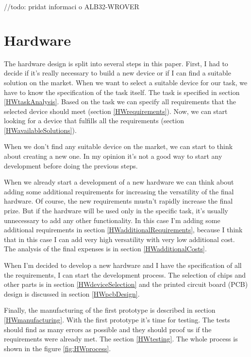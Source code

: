 //todo: pridat informaci o ALB32-WROVER

\chapter{Hardware}
The hardware design is split into several steps in this paper. First, I had to decide if it's really necessary to build a new device or if I can find a suitable solution on the market. When we want to select a suitable device for our task, we have to know the specification of the task itself. The task is specified in section \ref{HWtaskAnalysis}. Based on the task we can specify all requirements that the selected device should meet (section \ref{HWrequirements}). Now, we can start looking for a device that fulfills all the requirements (section \ref{HWavailableSolutions}).

When we don't find any suitable device on the market, we can start to think about creating a new one. In my opinion it's not a good way to start any development before doing the previous steps.

When we already start a development of a new hardware we can think about adding some additional requirements for increasing the versatility of the final hardware. Of course, the new requirements mustn't rapidly increase the final prize. But if the hardware will be used only in the specific task, it's usually unnecessary to add any other functionality. In this case I'm adding some additional requirements in section \ref{HWadditionalRequirements}, because I think that in this case I can add very high versatility with very low additional cost. The analysis of the final expenses is in section \ref{HWadditionalCosts}.

When I'm decided to develop a new hardware and I have the specification of all the requirements, I can start the development process. The selection of chips and other parts is in section \ref{HWdeviceSelection} and the printed circuit board (PCB) design is discussed in section \ref{HWpcbDesign}.

Finally, the manufacturing of the first prototype is described in section \ref{HWmanufacturing}. With the first prototype it's time for testing. The tests should find as many errors as possible and they should proof us if the requirements were already met. The section \ref{HWtesting}. The whole process is shown in the figure \ref{fig:HWprocess}.

